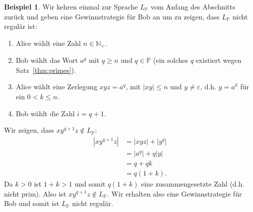 \documentclass[11pt, a4paper]{article}
\theoremstyle{definition}
\newtheorem*{example*}{Beispiel}
\theoremstyle{plain}
\numberwithin{equation}{section}
\begin{document}
\begin{example*}
	Wir kehren einmal zur Sprache $L_\mathbb{P}$ vom Anfang des Abschnitts zurück und geben eine Gewinnstrategie für Bob an um zu zeigen, dass $L_\mathbb{P}$ nicht regulär ist:
	\begin{enumerate}[label=\arabic*)]
	\item Alice wählt eine Zahl $n \in \mathbb{N}_+$.
	\item Bob wählt das Wort $a^q$ mit $q \geq n$ und $q \in \mathbb{P}$ (ein solches $q$ existiert wegen Satz~\ref{thm:primes}).
	\item Alice wählt eine Zerlegung $xyz = a^q$, mit $|xy| \leq n$ und $y \neq \varepsilon$, d.h. $y = a^k$ für ein $0 < k \leq n$.
	\item Bob wählt die Zahl $i = q+1$.
\end{enumerate}
Wir zeigen, dass $xy^{q+1}z \notin L_\mathbb{P}$:
\begin{align*}
	|xy^{q+1}z| &= |xyz| + |y^q|\\
	&= |a^q| + q |y|\\
	&= q + qk\\
	&= q(1 + k).
\end{align*}
Da $k > 0$ ist $1+k > 1$ und somit $q(1+k)$ eine zusammengesetzte Zahl (d.h. nicht prim). Also ist $xy^{q+1}z \notin L_\mathbb{P}$. Wir erhalten also eine Gewinnstrategie für Bob und somit ist $L_\mathbb{P}$ nicht regulär.
\end{example*}
\end{document}
